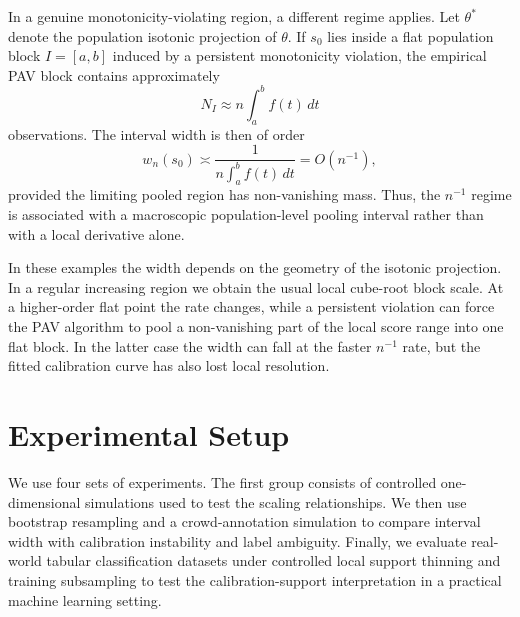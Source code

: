 \documentclass[11pt]{article}
\begin{document}
	In a genuine monotonicity-violating region, a different regime applies. Let $\theta^*$ denote the population isotonic projection of $\theta$. If $s_0$ lies inside a flat population block $I=[a,b]$ induced by a persistent monotonicity violation, the empirical PAV block contains approximately
	\begin{equation}
		N_I \approx n\int_a^b f(t)\,dt
	\end{equation}
	observations. The interval width is then of order
	\begin{equation}
		w_n(s_0)
		\asymp
		\frac{1}{n\int_a^b f(t)\,dt}
		=
		O(n^{-1}),
		\label{eq:scaling_law_violation}
	\end{equation}
	provided the limiting pooled region has non-vanishing mass. Thus, the $n^{-1}$ regime is associated with a macroscopic population-level pooling interval rather than with a local derivative alone.
	
	In these examples the width depends on the geometry of the isotonic projection. In a regular increasing region we obtain the usual local cube-root block scale. At a higher-order flat point the rate changes, while a persistent violation can force the PAV algorithm to pool a non-vanishing part of the local score range into one flat block. In the latter case the width can fall at the faster $n^{-1}$ rate, but the fitted calibration curve has also lost local resolution.
	
	\section{Experimental Setup}
	\label{sec:experiments}
	
	We use four sets of experiments. The first group consists of controlled one-dimensional simulations used to test the scaling relationships. We then use bootstrap resampling and a crowd-annotation simulation to compare interval width with calibration instability and label ambiguity. Finally, we evaluate real-world tabular classification datasets under controlled local support thinning and training subsampling to test the calibration-support interpretation in a practical machine learning setting.
	
\end{document}
